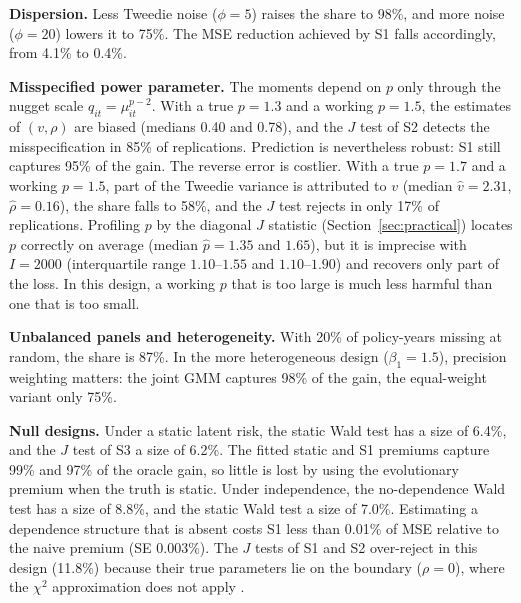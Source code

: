 \documentclass[mathematics,article,submit,moreauthors]{Definitions/mdpi}
\begin{document}
\textbf{Dispersion.} Less Tweedie noise ($\phi=5$) raises the share to 98\%, and more noise ($\phi=20$) lowers it to 75\%. The MSE reduction achieved by S1 falls accordingly, from 4.1\% to 0.4\%.

\textbf{Misspecified power parameter.} The moments depend on $p$ only through the nugget scale $q_{it}=\mu_{it}^{p-2}$. With a true $p=1.3$ and a working $p=1.5$, the estimates of $(v,\rho)$ are biased (medians 0.40 and 0.78), and the $J$ test of S2 detects the misspecification in 85\% of replications. Prediction is nevertheless robust: S1 still captures 95\% of the gain. The reverse error is costlier. With a true $p=1.7$ and a working $p=1.5$, part of the Tweedie variance is attributed to $v$ (median $\hat v=2.31$, $\hat\rho=0.16$), the share falls to 58\%, and the $J$ test rejects in only 17\% of replications. Profiling $p$ by the diagonal $J$ statistic (Section~\ref{sec:practical}) locates $p$ correctly on average (median $\hat p=1.35$ and $1.65$), but it is imprecise with $I=2000$ (interquartile range $1.10$--$1.55$ and $1.10$--$1.90$) and recovers only part of the loss. In this design, a working $p$ that is too large is much less harmful than one that is too small.

\textbf{Unbalanced panels and heterogeneity.} With 20\% of policy-years missing at random, the share is 87\%. In the more heterogeneous design ($\beta_1=1.5$), precision weighting matters: the joint GMM captures 98\% of the gain, the equal-weight variant only 75\%.

\textbf{Null designs.} Under a static latent risk, the static Wald test has a size of 6.4\%, and the $J$ test of S3 a size of 6.2\%. The fitted static and S1 premiums capture 99\% and 97\% of the oracle gain, so little is lost by using the evolutionary premium when the truth is static. Under independence, the no-dependence Wald test has a size of 8.8\%, and the static Wald test a size of 7.0\%. Estimating a dependence structure that is absent costs S1 less than 0.01\% of MSE relative to the naive premium (SE 0.003\%). The $J$ tests of S1 and S2 over-reject in this design (11.8\%) because their true parameters lie on the boundary ($\rho=0$), where the $\chi^2$ approximation does not apply \citep{andrews1999}.
\end{document}
